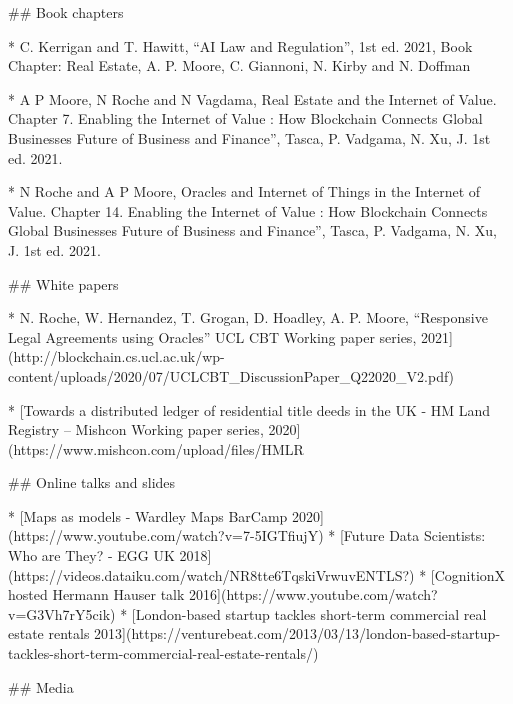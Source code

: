 ## Book chapters 

* C. Kerrigan and T. Hawitt, “AI Law and Regulation”, 1st ed. 2021, Book Chapter: Real Estate, A. P. Moore, C. Giannoni, N. Kirby and N. Doffman

* A P Moore,  N Roche and N Vagdama, Real Estate and the Internet of Value. Chapter 7. Enabling the Internet of Value : How Blockchain Connects Global Businesses Future of Business and Finance”, Tasca, P. Vadgama, N. Xu, J. 1st ed. 2021.

* N Roche and A P Moore, Oracles and Internet of Things in the Internet of Value. Chapter 14. Enabling the Internet of Value : How Blockchain Connects Global Businesses Future of Business and Finance”, Tasca, P. Vadgama, N. Xu, J. 1st ed. 2021.

## White papers 

* N. Roche, W. Hernandez, T. Grogan, D. Hoadley, A. P. Moore, “Responsive Legal Agreements using Oracles” UCL CBT Working paper series, 2021](http://blockchain.cs.ucl.ac.uk/wp-content/uploads/2020/07/UCLCBT_DiscussionPaper_Q22020_V2.pdf)

* [Towards a distributed ledger of residential title deeds in the UK - HM Land Registry – Mishcon Working paper series, 2020](https://www.mishcon.com/upload/files/HMLR%

## Online talks and slides 

* [Maps as models - Wardley Maps BarCamp 2020](https://www.youtube.com/watch?v=7-5IGTfiujY)
* [Future Data Scientists: Who are They? - EGG UK 2018](https://videos.dataiku.com/watch/NR8tte6TqskiVrwuvENTLS?)
* [CognitionX hosted Hermann Hauser talk 2016](https://www.youtube.com/watch?v=G3Vh7rY5cik)
* [London-based startup tackles short-term commercial real estate rentals 2013](https://venturebeat.com/2013/03/13/london-based-startup-tackles-short-term-commercial-real-estate-rentals/)

## Media 

